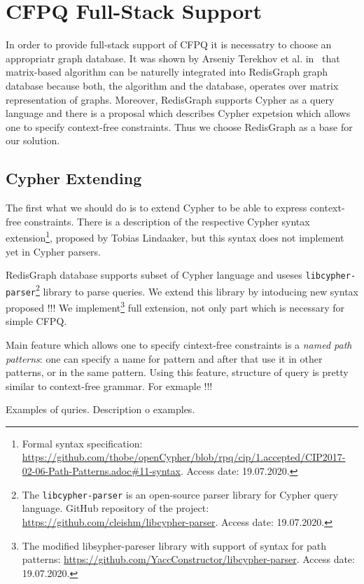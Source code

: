\section{CFPQ Full-Stack Support}

In order to provide full-stack support of CFPQ it is necessatry to choose an appropriatr graph database.
It was shown by Arseniy Terekhov et al. in~\cite{10.1145/3398682.3399163} that matrix-based algorithm can be naturelly integrated into RedisGraph graph database because both, the algorithm and the database, operates over matrix representation of graphs.
Moreover, RedisGraph supports Cypher as a query language and there is a proposal which describes Cypher expetsion which allows one to specify context-free constraints.
Thus we choose RedisGraph as a base for our solution.  


\subsection{Cypher Extending}

The first what we should do is to extend Cypher to be able to express context-free constraints.
There is a description of the respective Cypher syntax extension\footnote{Formal syntax specification: \url{https://github.com/thobe/openCypher/blob/rpq/cip/1.accepted/CIP2017-02-06-Path-Patterns.adoc\#11-syntax}. Access date: 19.07.2020.}, proposed by Tobias Lindaaker, but this syntax does not implement yet in Cypher parsers.

RedisGraph database supports subset of Cypher language and useses \texttt{libcypher-parser}\footnote{The \texttt{libcypher-parser} is an open-source parser library for Cypher query language. GitHub repository of the project: \url{https://github.com/cleishm/libcypher-parser}. Access date: 19.07.2020.} library to parse queries.
We extend this library by intoducing new syntax proposed !!! 
We implement\footnote{The modified libsypher-pareser library with support of syntax for path patterns: \url{https://github.com/YaccConstructor/libcypher-parser}. Access date: 19.07.2020.} full extension, not only part which is necessary for simple CFPQ. 


Main feature which allows one to specify cintext-free constraints is a \textit{named path patterns}: one can specify a name for pattern and after that use it in other patterns, or in the same pattern.
Using this feature, structure of query is pretty similar to context-free grammar.
For exmaple !!!


Examples of quries. Description o examples.

